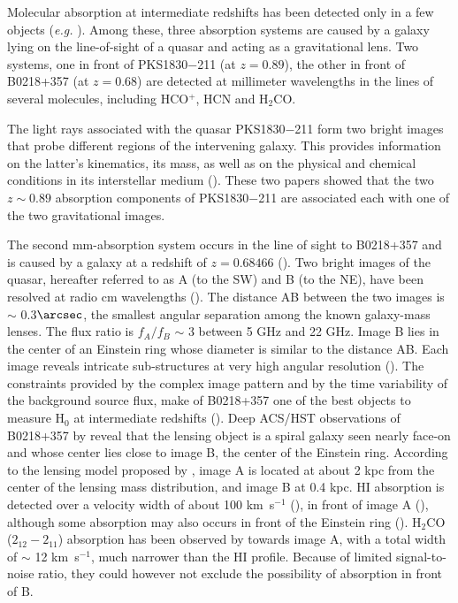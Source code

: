 \documentclass[oldversion]{aa}
\begin{document}
Molecular absorption at intermediate redshifts has been detected only in a few objects
({\em e.g.} \citealt{wik95,wik96,wik97,wik98,kan05}).
Among these, three absorption systems are
caused by a galaxy lying on the line-of-sight of a quasar and acting as a gravitational
lens. Two systems, one in front of PKS1830$-$211 (at $z=0.89$), the other in front of B0218+357 (at $z=0.68$) are
detected at millimeter wavelengths in the lines of several molecules, including HCO$^+$,
HCN and H$_2$CO.

The light rays associated with the quasar PKS1830$-$211 form two bright images that probe
different regions of the intervening galaxy. This provides information on the latter's kinematics,
its mass, as well as on the physical and chemical conditions in its interstellar medium
(\citealt{wik98,mul06}). 
These two papers showed that the two $z \sim 0.89$ absorption components of PKS1830$-$211 are
associated each with one of the two gravitational images.



The second mm-absorption system occurs in the line of sight to B0218+357 and is caused by a
galaxy at a redshift of $z = 0.68466$ (\citealt{bro93,car93,wik95}). Two bright images of the
quasar, hereafter referred to as A (to the SW) and B (to the NE), have been
resolved at radio cm wavelengths (\citealt{ode92,pat93}). The distance AB between the two
images is $\sim$ 0.3$\arcsec$, the smallest angular separation among the known
galaxy-mass lenses. The flux ratio is $f_A/f_B$ $\sim$ 3 between 5 GHz and 22 GHz. Image
B lies in the center of an Einstein ring whose diameter is similar to the distance
AB. Each image reveals intricate sub-structures at very high angular resolution
(\citealt{pat95, big03}).  The constraints provided by the complex image pattern and by the
time variability of the background source flux, make of B0218+357 one of the best objects
to measure H$_0$ at intermediate redshifts (\citealt{big03,wuc04,yor05}).
Deep ACS/HST observations of B0218+357 by \citet{yor05} reveal that the lensing object is a
spiral galaxy seen nearly face-on and whose center lies close to image B, the center of the
Einstein ring. According to the lensing model proposed by \citet{wuc04}, image A is located
at about 2 kpc from the center of the lensing mass distribution, and image B at 0.4 kpc. HI
absorption is detected over a velocity width of about 100 km~s$^{-1}$ (\citealt{car93, kan03}),
in front of image A (\citealt{car00}), although some absorption may also occurs in front of the
Einstein ring (\citealt{kan03}). H$_2$CO ($2_{12}-2_{11}$) absorption has been observed by
\citet{men96} towards image A, with a total width of $\sim$ 12 km~s$^{-1}$, much narrower
than the HI profile. Because of limited signal-to-noise ratio, they could however not
exclude the possibility of absorption in front of B.
\end{document}

